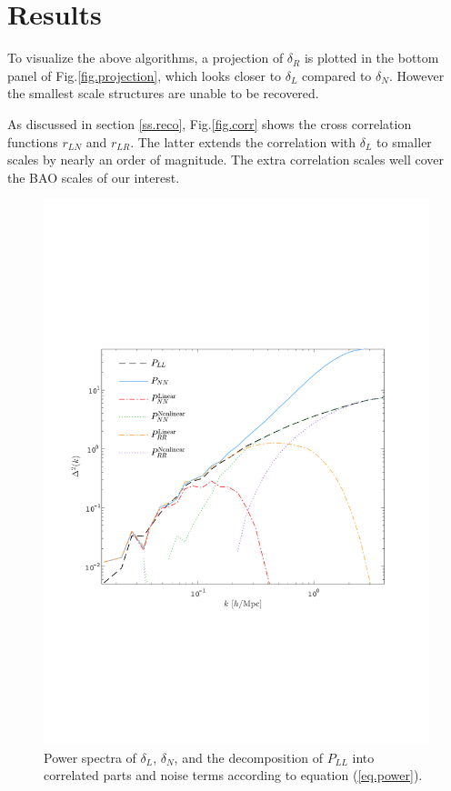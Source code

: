 \documentclass[aps,prd,twocolumn,superscriptaddress,amsfont,amssymb,amsmath,nofootinbib,showpacs,balancelastpage]{revtex4-1}
\begin{document}
\section{Results}\label{sec.results}

To visualize the above algorithms, a projection of $\delta_R$ is plotted in
the bottom panel of Fig.\ref{fig.projection}, which looks closer to 
$\delta_L$ compared to $\delta_N$. However the smallest scale structures are unable
to be recovered.

As discussed in section \ref{ss.reco},
Fig.\ref{fig.corr} shows the cross correlation functions
$r_{LN}$ and $r_{LR}$. The latter extends the correlation
with $\delta_L$ to smaller scales by nearly an order of
magnitude. The extra correlation scales well cover the BAO
scales of our interest.

\begin{figure}[t] \centering
  \includegraphics[width=1.0\linewidth]{power.pdf}
  \caption{Power spectra of $\delta_L$, $\delta_N$, and the decomposition
  of $P_{LL}$ into correlated parts and noise terms according to equation
  (\ref{eq.power}).}
  \label{fig.recopower}
\end{figure}
\end{document}
